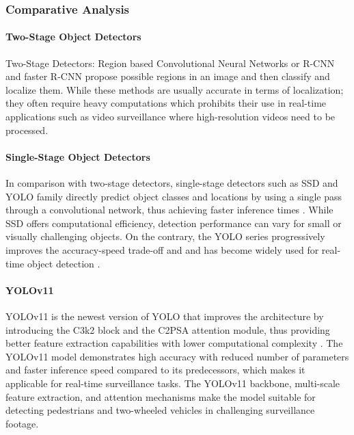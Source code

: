 \documentclass[conference]{IEEEtran}
\begin{document}
\subsubsection{Comparative Analysis}

\paragraph{Two-Stage Object Detectors}

Two-Stage Detectors: Region based Convolutional Neural Networks or R-CNN and faster R-CNN propose possible regions in an image and then classify and localize them. While these methods are usually accurate in terms of localization; they often require heavy computations which prohibits their use in real-time applications such as video surveillance \cite{fasterrcnn} where high-resolution videos need to be processed.

\paragraph{Single-Stage Object Detectors}

In comparison with two-stage detectors, single-stage detectors such as SSD and YOLO family directly predict object classes and locations by using a single pass through a convolutional network, thus achieving faster inference times \cite{ssd,yolo}. While SSD offers computational efficiency, detection performance can
vary for small or visually challenging objects. On the contrary, the YOLO series progressively improves the accuracy-speed trade-off and and has become widely used for real-time object detection \cite{yolov8,yolov10,yolov11}.

\paragraph{YOLOv11}

YOLOv11 is the newest version of YOLO that improves the architecture by introducing the C3k2 block and the C2PSA attention module, thus providing better feature extraction capabilities with lower computational complexity \cite{yolov11}. The YOLOv11 model demonstrates high accuracy with reduced number of parameters and faster inference speed compared to its predecessors, which makes it applicable for real-time surveillance tasks. The YOLOv11 backbone, multi-scale feature extraction, and attention
mechanisms make the model suitable for detecting pedestrians and
two-wheeled vehicles in challenging surveillance footage.
\end{document}
